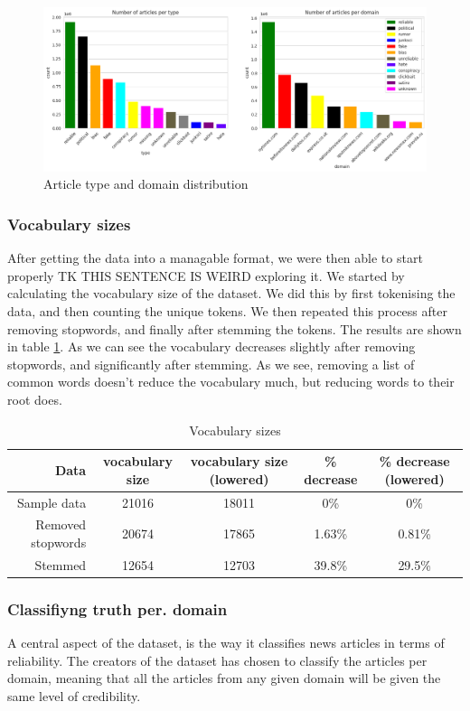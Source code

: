 \begin{figure}[htpb]
  \centering
  \includegraphics[width=1\textwidth]{combdist}
  \caption{Article type and domain distribution}
  \label{fig:combdist}
\end{figure}
\subsubsection{Vocabulary sizes}
After getting the data into a managable format, we were then able to start properly TK THIS SENTENCE IS WEIRD exploring it. We started by
calculating the vocabulary size of the dataset. We did this by first tokenising the data, and then counting the
unique tokens. We then repeated this process after removing stopwords, and finally after stemming the tokens. The
results are shown in table \ref{tab:vocab_sizes}. As we can see the vocabulary decreases slightly after removing
stopwords, and significantly after stemming. As we see, removing a list of common words doesn't reduce the vocabulary
much, but reducing words to their root does.

\begin{table}[h]
    \centering
    \begin{tabular}{r| c | c | c| c}
      Data& vocabulary size & vocabulary size (lowered) & \% decrease & \% decrease (lowered)\\
        \hline
      Sample data& 21016 & 18011 & 0\% & 0\% \\
    \hline
      Removed stopwords & 20674 & 17865 & 1.63\% & 0.81\% \\
    \hline
      Stemmed & 12654 & 12703 & 39.8\% & 29.5\%
    \end{tabular}
    \caption{Vocabulary sizes}
    \label{tab:vocab_sizes}
\end{table}



\subsubsection{Classifiyng truth per. domain}\label{sec:truth_pr_domain}
A central aspect of the dataset, is the way it classifies news articles in terms of reliability. The creators of the
dataset has chosen to classify the articles per domain, meaning that all the articles from any given domain will be
given the same level of credibility.

